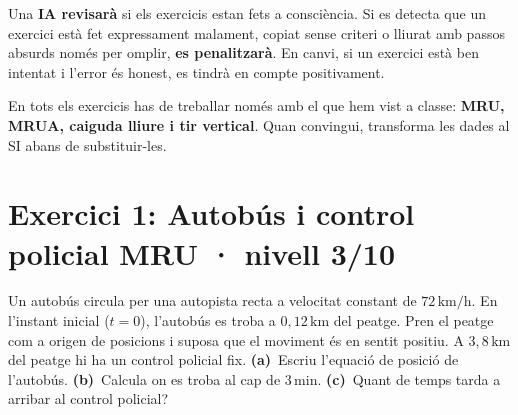 \documentclass[11pt,a4paper]{article}
\begin{document}
Una \textbf{IA revisarà} si els exercicis estan fets a consciència. Si es detecta que un exercici està fet expressament malament, copiat sense criteri o lliurat amb passos absurds només per omplir, \textbf{es penalitzarà}. En canvi, si un exercici està ben intentat i l'error és honest, es tindrà en compte positivament.

En tots els exercicis has de treballar només amb el que hem vist a classe: \textbf{MRU, MRUA, caiguda lliure i tir vertical}. Quan convingui, transforma les dades al SI abans de substituir-les.

\clearpage

\section*{Exercici 1: Autobús i control policial \hfill \normalfont MRU · nivell 3/10}

Un autobús circula per una autopista recta a velocitat constant de $72\,\mathrm{km/h}$. En l'instant inicial ($t=0$), l'autobús es troba a $0{,}12\,\mathrm{km}$ del peatge. Pren el peatge com a origen de posicions i suposa que el moviment és en sentit positiu. A $3{,}8\,\mathrm{km}$ del peatge hi ha un control policial fix. \textbf{(a)}~Escriu l'equació de posició de l'autobús. \textbf{(b)}~Calcula on es troba al cap de $3\,\mathrm{min}$. \textbf{(c)}~Quant de temps tarda a arribar al control policial?
\end{document}
